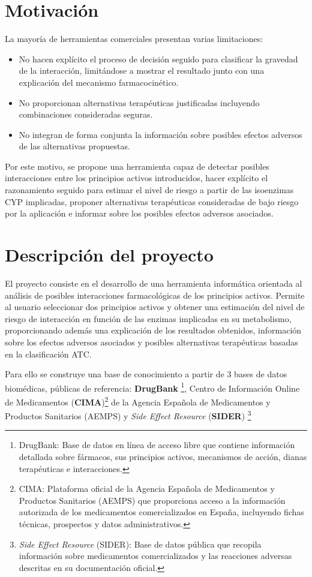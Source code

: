 \section{Motivación}
La mayoría de herramientas comerciales presentan varias limitaciones:
\begin{itemize}
\item No hacen explícito el proceso de decisión seguido para clasificar la gravedad de la interacción, limitándose a mostrar el resultado junto con una explicación del mecanismo farmacocinético.
\item No proporcionan alternativas terapéuticas justificadas incluyendo combinaciones consideradas seguras.
\item No integran de forma conjunta la información sobre posibles efectos adversos de las alternativas propuestas.
\end{itemize}
Por este motivo, se propone una herramienta capaz de detectar posibles interacciones entre los principios activos introducidos, hacer explícito el razonamiento seguido para estimar el nivel de riesgo a partir de las isoenzimas CYP implicadas, proponer alternativas terapéuticas consideradas de bajo riesgo por la aplicación e informar sobre los posibles efectos adversos asociados.

\section{Descripción del proyecto}
El proyecto consiste en el desarrollo de una herramienta informática orientada al análisis de posibles interacciones farmacológicas 
de los principios activos. Permite al usuario seleccionar dos principios activos y obtener una estimación 
del nivel de riesgo de interacción en función de las enzimas implicadas en su metabolismo, proporcionando además una explicación de los 
resultados obtenidos, información sobre los efectos adversos asociados y posibles alternativas terapéuticas basadas en la clasificación 
ATC.

Para ello se construye una base de conocimiento a partir de 3 bases de datos biomédicas, públicas de referencia: \textbf{DrugBank} \footnote{DrugBank: Base de datos en línea de acceso libre que contiene información detallada sobre fármacos, sus principios activos, mecanismos de acción, dianas terapéuticas e interacciones.}, Centro de Información Online de Medicamentos (\textbf{CIMA})\footnote{CIMA: Plataforma oficial de la Agencia Española de Medicamentos y Productos Sanitarios (AEMPS) que proporciona acceso a la información autorizada de los medicamentos comercializados en España, incluyendo fichas técnicas, prospectos y datos administrativos.} de la Agencia Española de Medicamentos y Productos Sanitarios (AEMPS) y \textit{Side Effect Resource} (\textbf{SIDER}) \footnote{\textit{Side Effect Resource} (SIDER): Base de datos pública que recopila información sobre medicamentos comercializados y las reacciones adversas descritas en su documentación oficial.}

